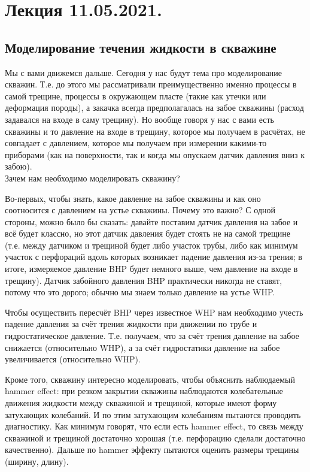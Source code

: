 \documentclass[main.tex]{subfiles}
\begin{document}

\section{Лекция 11.05.2021.}

\subsection{Моделирование течения жидкости в скважине}


Мы с вами движемся дальше.
Сегодня у нас будут тема про моделирование скважин.
Т.е. до этого мы рассматривали преимущественно именно процессы в самой трещине, процессы в окружающем пласте (такие как утечки или деформация породы), а закачка всегда предполагалась на забое скважины (расход задавался на входе в саму трещину).
Но вообще говоря у нас с вами есть скважины и то давление на входе в трещину, которое мы получаем в расчётах, не совпадает с давлением, которое мы получаем при измерении какими-то приборами (как на поверхности, так и когда мы опускаем датчик давления вниз к забою).
\\

Зачем нам необходимо моделировать скважину?

Во-первых, чтобы знать, какое давление на забое скважины и как оно соотносится с давлением на устье скважины.
Почему это важно?
С одной стороны, можно было бы сказать: давайте поставим датчик давления на забое и всё будет классно, но этот датчик давления будет стоять не на самой трещине (т.е. между датчиком и трещиной будет либо участок трубы, либо как минимум участок с перфораций вдоль которых возникает падение давления из-за трения; в итоге, измеряемое давление BHP будет немного выше, чем давление на входе в трещину).
Датчик забойного давления BHP практически никогда не ставят, потому что это дорого; обычно мы знаем только давление на устье WHP.

Чтобы осуществить пересчёт BHP через известное WHP нам необходимо учесть падение давления за счёт трения жидкости при движении по трубе и гидростатическое давление.
Т.е. получаем, что за счёт трения давление на забое снижается (относительно WHP), а за счёт гидростатики давление на забое увеличивается (относительно WHP).

Кроме того, скважину интересно моделировать, чтобы объяснить наблюдаемый hammer effect: при резком закрытии скважины наблюдаются колебательные движения жидкости между скважиной и трещиной, которые имеют форму затухающих колебаний.
И по этим затухающим колебаниям пытаются проводить диагностику. Как минимум говорят, что если есть hammer effect, то связь между скважиной и трещиной достаточно хорошая (т.е. перфорацию сделали достаточно качественно).
Дальше по hammer эффекту пытаются оценить размеры трещины (ширину, длину).
\end{document}
